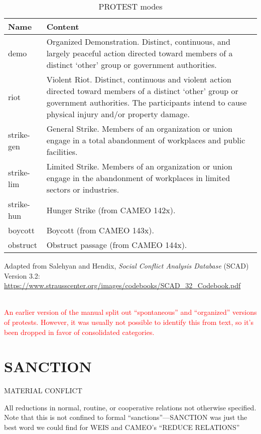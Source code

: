 \documentclass[11pt]{report}
\newcommand{\plcat}[1]{\textsf{#1}}
\newcommand{\andy}[1]{\textcolor{red}{#1}}
\begin{document}
\begin{table}[htp]
\caption{PROTEST modes}
\begin{center}
\begin{tabular}{|l|p{13cm}|}
\hline
Name & Content \\
\hline
demo & Organized Demonstration. Distinct, continuous, and largely peaceful action directed toward
members of a distinct `other' group or government authorities.  \\
riot & Violent Riot. Distinct, continuous and violent action directed toward members of
a distinct `other' group or government authorities. The participants intend to cause physical injury and/or property damage. \\
strike-gen & General Strike. Members of an organization or union engage in a total abandonment of
workplaces and public facilities.\\
strike-lim & Limited Strike. Members of an organization or union engage in the abandonment of
workplaces in limited sectors or industries.\\
strike-hun & Hunger Strike (from CAMEO 142x).\\
boycott & Boycott (from CAMEO 143x).\\
obstruct & Obstruct passage (from CAMEO 144x).\\
\hline
\end{tabular}
\end{center}
\label{tab:protestmode}
\raggedright{Adapted from Salehyan and Hendix, \textit{Social Conflict Analysis Database} (SCAD)
Version 3.2: \url{https://www.strausscenter.org/images/codebooks/SCAD\_32\_Codebook.pdf}}\\~

\andy{An earlier version of the manual split out ``spontaneous'' and ``organized'' versions of protests. However, it was usually not possible to identify this from text, so it's been dropped in favor of consolidated categories.}
\end{table}%

\newpage  


\section{SANCTION}

\textsf{MATERIAL CONFLICT} \vspace{8pt}

All reductions in normal, routine, or cooperative relations not otherwise specified. Note that this is not confined to formal ``sanctions''---\plcat{SANCTION} was just the best word we could find for WEIS and CAMEO's ``REDUCE RELATIONS''
\end{document}
